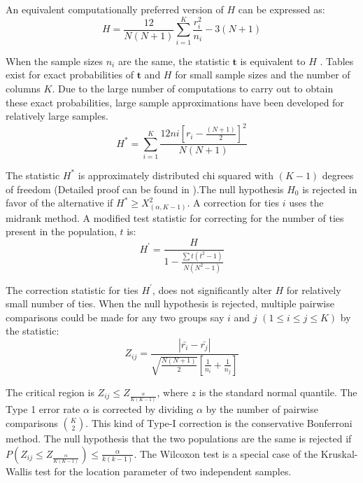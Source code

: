 \documentclass[12pt,oneside]{report}
\theoremstyle{definition}
\theoremstyle{mystyle}
\begin{document}
\vspace{5mm}
An equivalent   computationally preferred  version of $H$ can be expressed as:
\begin{equation}
H=\frac{12}{N(N+1)}\sum\limits_{i=1}^{K}\frac{r_{i}^{2}}{n_{i}}-3(N+1)
\end{equation}

\vspace{5mm}
When the sample sizes $n_{i}$ are the same, the statistic $\textbf{t}$ is equivalent to $H$ \cite{npsi}. Tables exist for exact probabilities of $\textbf{t}$ and $H$ for small sample sizes and the number of columns $K$. Due to the large number of computations to carry out to obtain these exact probabilities, large sample approximations have been developed for relatively large samples.
\begin{equation}
H^{*}=\displaystyle\sum\limits_{i=1}^{K}\frac{12n{i\left[r_{i}-\frac{(N+1)}{2}\right]^2}}{N(N+1)}
\end{equation}

\vspace{5mm}
The statistic $H^{*}$ is  approximately distributed  chi squared with $(K-1)$ degrees of freedom (Detailed proof can be found in \cite{npsi}).The null hypothesis $H_{0}$  is rejected in favor of the alternative if  $H^{*}\geq X^{2}_{(\alpha,K-1)}$. A correction for  ties  $i$ uses the midrank method. A modified test statistic for correcting for  the number of ties present in the population, $t$  is: 
\begin{equation}
H^{\prime}=\frac{H}{1-\frac{\sum t(t^{2}-1)}{N(N^{2}-1)}}
\end{equation}

\vspace{5mm}
The correction statistic for ties $H^{\prime}$,  does not significantly alter $H$ for relatively small number of ties. When the null hypothesis is rejected, multiple pairwise comparisons could be made for any two groups say $i$ and $j$ $(1\leq i\le j \leq K)$ by the statistic:
\begin{equation}
Z_{ij}=\displaystyle  \frac{|\bar{r_{i}}-\bar{r_{j}}|}{\sqrt{\frac{N(N+1)}{2}}\left[\frac{1}{n_{i}}+\frac{1}{n_{j}}\right]}
\end{equation}

\vspace{5mm}
The critical region is $Z_{ij} \leq Z_{\frac{\alpha}{K(K-1)}}$, where $z$ is the standard normal quantile. The Type 1 error rate  $\alpha$ is corrected by  dividing $\alpha$ by  the number of pairwise comparisons $\binom{K}{2}$. This kind of Type-I correction is the conservative  Bonferroni method. The null hypothesis that the two populations are the same is rejected if $P(Z_{ij} \leq Z_{\frac{\alpha}{K(K-1)}}) \leq \frac{\alpha}{k(k-1)}$.
The Wilcoxon test is a special case of the Kruskal-Wallis test for the location parameter of two independent samples.
\end{document}
